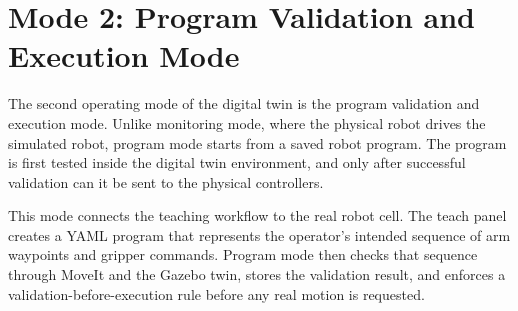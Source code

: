 \section{Mode 2: Program Validation and Execution Mode}

The second operating mode of the digital twin is the program validation and execution mode. Unlike monitoring mode, where the physical robot drives the simulated robot, program mode starts from a saved robot program. The program is first tested inside the digital twin environment, and only after successful validation can it be sent to the physical controllers.

This mode connects the teaching workflow to the real robot cell. The teach panel creates a YAML program that represents the operator's intended sequence of arm waypoints and gripper commands. Program mode then checks that sequence through MoveIt and the Gazebo twin, stores the validation result, and enforces a validation-before-execution rule before any real motion is requested.

